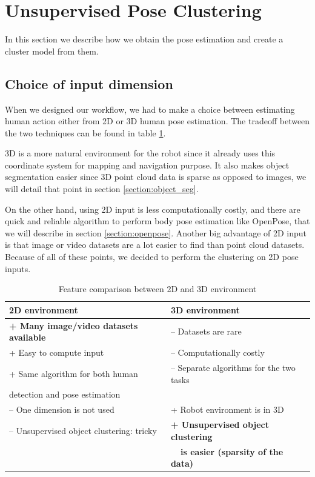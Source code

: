 \section{Unsupervised Pose Clustering}
In this section we describe how we obtain the pose estimation and create a cluster model from them.

\subsection{Choice of input dimension}
When we designed our workflow, we had to make a choice between estimating human action either from 2D or 3D human pose estimation. The tradeoff between the two techniques can be found in table \ref{tab:dimension_comparison}.

3D is a more natural environment for the robot since it already uses this coordinate system for mapping and navigation purpose. It also makes object segmentation easier since 3D point cloud data is sparse as opposed to images, we will detail that point in section \ref{section:object_seg}.

On the other hand, using 2D input is less computationally costly, and there are quick and reliable algorithm to perform body pose estimation like OpenPose, that we will describe in section \ref{section:openpose}. Another big advantage of 2D input is that image or video datasets are a lot easier to find than point cloud datasets. Because of all of these points, we decided to perform the clustering on 2D pose inputs.

\begin{table}[h]
    \centering
    \caption{Feature comparison between 2D and 3D environment}
    \label{tab:dimension_comparison}
    \begin{tabular}{|l|l|}
        \hline
        2D environment & 3D environment \\ \hline
        \textbf{+ Many image/video datasets available} & -- Datasets are rare \\
        + Easy to compute input & -- Computationally costly \\
        + Same algorithm for both human & -- Separate algorithms for the two tasks \\ detection and pose estimation & \\
        -- One dimension is not used & + Robot environment is in 3D \\
        -- Unsupervised object clustering: tricky & \textbf{+ Unsupervised object clustering} \\
        & \textbf{~~is easier (sparsity of the data)}
        \\ \hline
    \end{tabular}
\end{table}

